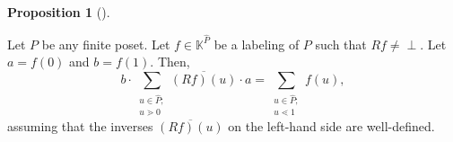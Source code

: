 \documentclass[numbers=enddot,12pt,final,onecolumn,notitlepage]{scrartcl}%
\theoremstyle{definition}
\newtheorem{prop}[theo]{Proposition}
\newenvironment{proposition}[1][]
{\begin{prop}[#1]\begin{leftbar}}
{\end{leftbar}\end{prop}}
\newcommand{\undf}{\operatorname*{\bot}}
\let\sumnonlimits\sum
\renewcommand{\sum}{\sumnonlimits\limits}
\begin{document}
\begin{proposition}
\label{prop.R.bottom-top}Let $P$ be any finite poset. Let $f\in\mathbb{K}%
^{\widehat{P}}$ be a labeling of $P$ such that $Rf\neq\undf$. Let $a=f\left(
0\right)  $ and $b=f\left(  1\right)  $. Then,%
\begin{equation}
b\cdot\sum_{\substack{u\in\widehat{P};\\u\gtrdot0}}\overline{\left(
Rf\right)  \left(  u\right)  }\cdot a=\sum_{\substack{u\in\widehat{P}%
;\\u\lessdot1}}f\left(  u\right)  , \label{eq.prop.R.bottom-top.eq}%
\end{equation}
assuming that the inverses $\overline{\left(  Rf\right)  \left(  u\right)  }$
on the left-hand side are well-defined.
\end{proposition}
\end{document}
